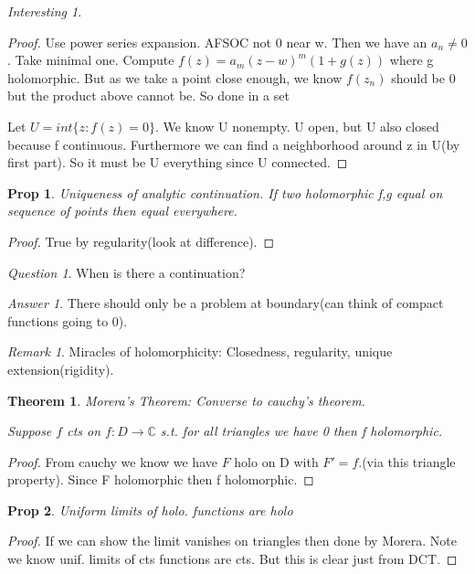 \documentclass[11pt]{article}
\newcommand{\C}{\mathbb{C}}
\newtheorem{theorem}{Theorem}
\newtheorem{prop}{Prop}
\theoremstyle{remark}
\newtheorem{remark}{Remark}
\newtheorem{quest}{Question}
\newtheorem{ans}{Answer}
\newtheorem{interest}{Interesting}
\begin{document}
\begin{interest}
\begin{proof}
	Use power series expansion. AFSOC not 0 near w. Then we have an $a_n \neq 0$. Take minimal one. Compute $f(z) = a_m(z-w)^m(1+g(z))$ where g holomorphic. But as we take a point close enough, we know $f(z_n)$ should be 0 but the product above cannot be. So done in a set

	Let $U = int\{z: f(z) = 0\}$. We know U nonempty. U open, but U also closed because f continuous. Furthermore we can find a neighborhood around z in U(by first part). So it must be U everything since U connected. 
\end{proof}

\begin{prop}
	Uniqueness of analytic continuation. If two holomorphic f,g equal on sequence of points then equal everywhere.
\end{prop}

\begin{proof}
	True by regularity(look at difference). 
\end{proof}

\begin{quest}
	When is there a continuation?
\end{quest}

\begin{ans}
	There should only be a problem at boundary(can think of compact functions going to 0).
\end{ans}

\begin{remark}
	Miracles of holomorphicity: Closedness, regularity, unique extension(rigidity).
\end{remark}

\begin{theorem}
	Morera's Theorem: Converse to cauchy's theorem.

	Suppose $f$ cts on $f : D \to \C$ s.t. for all triangles we have 0 then f holomorphic.
\end{theorem}

\begin{proof}
	From cauchy we know we have $F$ holo on D with $F' = f$.(via this triangle property). Since F holomorphic then f holomorphic. 
\end{proof}

\begin{prop}
	Uniform limits of holo. functions are holo
\end{prop}

\begin{proof}
	If we can show the limit vanishes on triangles then done by Morera. Note we know unif. limits of cts functions are cts. But this is clear just from DCT.
\end{proof}


\end{interest}
\end{document}
